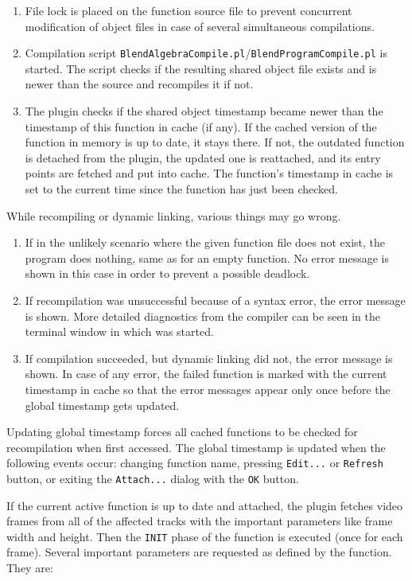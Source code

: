 \begin{enumerate}
\item File lock is placed on the function source file to prevent concurrent modification of object files in case of several simultaneous compilations.
\item Compilation script \texttt{BlendAlgebraCompile.pl}/\texttt{BlendProgramCompile.pl} is started. The script checks if the resulting shared object file exists and is newer than the source and recompiles it if not.
\item The plugin checks if the shared object timestamp became newer than the timestamp of this function in cache (if any). If the cached version of the function in memory is up to date, it stays there. If not, the outdated function is detached from the plugin, the updated one is reattached, and its entry points are fetched and put into cache. The function's timestamp in cache is set to the current time since the function has just been checked.
\end{enumerate}

While recompiling or dynamic linking, various things may go wrong.
\begin{enumerate}
\item If in the unlikely scenario where the given function file does not exist, the program does nothing, same as for an empty function. No error message is shown in this case in order to prevent a possible deadlock. 
\item If recompilation was unsuccessful because of a syntax error, the error message is shown. More detailed diagnostics from the compiler can be seen in the terminal window in which \CGG{} was started. 
\item If compilation succeeded, but dynamic linking did not, the error message is shown. In case of any error, the failed function is marked with the current timestamp in cache so that the error messages appear only once before the global timestamp gets updated.
\end{enumerate}

Updating global timestamp forces all cached functions to be checked for recompilation when first accessed. The global timestamp is updated when the following events occur: changing function name, pressing \texttt{Edit...} or \texttt{Refresh} button, or exiting the \texttt{Attach...} dialog with the \texttt{OK} button.

If the current active function is up to date and attached, the plugin fetches video frames from all of the affected tracks with the important parameters like frame width and height. Then the \texttt{INIT} phase of the function is executed (once for each frame). Several important parameters are requested as defined by the function. They are:

